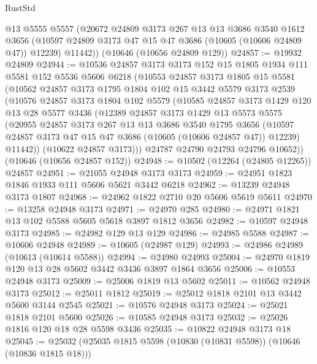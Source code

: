 \begin{lexlean}{RustStd}
\begin{coremodule}
      @13
      @5555
      @5557
      (@20672
        @24809
        @3173
        @267
        @13
        @13
        @3686
        @3540
        @1612
        @3656
        (@10597 @24809 @3173 @47 @15 @47 @3686 (@10605 (@10606 @24809 @47)) @12239)
        @11442))
    (@10646 (@10656 @24809 @129))
@24857 := @19932 @24809
@24944 := @10536
    @24857
    @3173
    @3173
    @152
    @15
    @1805
    @1934
    @111
    @5581
    @152
    @5536
    @5606
    @6218
    (@10553
      @24857
      @3173
      @1805
      @15
      @5581
      (@10562
        @24857
        @3173
        @1795
        @1804
        @102
        @15
        @3442
        @5579
        @3173
        @2539
        (@10576
          @24857
          @3173
          @1804
          @102
          @5579
          (@10585
            @24857
            @3173
            @1429
            @120
            @13
            @28
            @5577
            @3436
            (@12389
              @24857
              @3173
              @1429
              @13
              @5573
              @5575
              (@20955
                @24857
                @3173
                @267
                @13
                @13
                @3686
                @3540
                @1795
                @3656
                (@10597 @24857 @3173 @47 @15 @47 @3686 (@10605 (@10606 @24857 @47)) @12239)
                @11442))
            (@10622 @24857 @3173)))
        @24787
        @24790
        @24793
        @24796
        @10652))
    (@10646 (@10656 @24857 @152))
@24948 := @10502 (@12264 (@24805 @12265)) @24857
@24951 := @21055 @24948 @3173 @3173
@24959 := @24951 @1823 @1846 @1933 @111 @5606 @5621 @3442 @6218
@24962 := @13239 @24948 @3173 @1807
@24968 := @24962 @1822 @2710 @20 @5606 @5619 @5611
@24970 := @13258 @24948 @3173
@24971 := @24970 @285
@24980 := @24971 @1821 @13 @102 @5588 @5605 @5618 @3897 @1812 @3656
@24982 := @10597 @24948 @3173
@24985 := @24982 @129 @13 @129
@24986 := @24985 @5588
@24987 := @10606 @24948
@24989 := @10605 (@24987 @129)
@24993 := @24986 @24989 (@10613 (@10614 @5588))
@24994 := @24980 @24993
@25004 := @24970 @1819 @120 @13 @28 @5602 @3442 @3436 @3897 @1864 @3656
@25006 := @10553 @24948 @3173
@25009 := @25006 @1819 @13 @5602
@25011 := @10562 @24948 @3173
@25012 := @25011 @1812
@25019 := @25012 @1818 @2101 @13 @3442 @5600 @3144 @2545
@25021 := @10576 @24948 @3173
@25024 := @25021 @1818 @2101 @5600
@25026 := @10585 @24948 @3173
@25032 := @25026 @1816 @120 @18 @28 @5598 @3436
@25035 := @10822 @24948 @3173 @18
@25045 := @25032 (@25035 @1815 @5598 (@10830 (@10831 @5598)) (@10646 (@10836 @1815 @18)))

\end{coremodule}
\end{lexlean}
